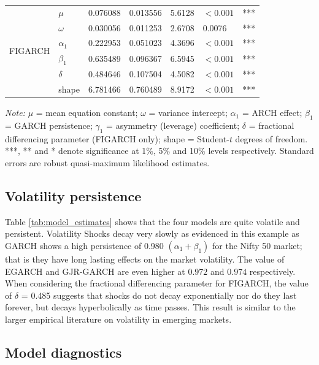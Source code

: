\begin{table}[H]
\begin{tabular}{|l|l|l|l|l|l|l|}
\hline
\multirow{6}{*}{FIGARCH}
 & $\mu$      & 0.076088 & 0.013556 & 5.6128  & $<0.001$ & *** \\
 & $\omega$   & 0.030056 & 0.011253 & 2.6708  & 0.0076   & *** \\
 & $\alpha_1$ & 0.222953 & 0.051023 & 4.3696  & $<0.001$ & *** \\
 & $\beta_1$  & 0.635489 & 0.096367 & 6.5945  & $<0.001$ & *** \\
 & $\delta$   & 0.484646 & 0.107504 & 4.5082  & $<0.001$ & *** \\
 & shape      & 6.781466 & 0.760489 & 8.9172  & $<0.001$ & *** \\
\hline
\end{tabular}
\end{table}


\vspace{-1em}
\noindent\footnotesize\textit{Note:} $\mu$ = mean equation 
constant; $\omega$ = variance intercept; $\alpha_1$ = ARCH 
effect; $\beta_1$ = GARCH persistence; $\gamma_1$ = 
asymmetry (leverage) coefficient; $\delta$ = fractional 
differencing parameter (FIGARCH only); shape = Student-$t$ 
degrees of freedom. ***, ** and * denote significance at 
1\%, 5\% and 10\% levels respectively. Standard errors 
are robust quasi-maximum likelihood estimates.




\subsection{Volatility persistence}

Table \ref{tab:model_estimates}  shows that the four models are quite volatile and persistent. Volatility Shocks decay very slowly as evidenced in this example as GARCH shows a high persistence of 0.980
$(\alpha_1 + \beta_1)$ for the Nifty 50 market; that is they have long lasting effects on the market volatility. The value of EGARCH and GJR-GARCH are even higher at $0.972$ and $0.974$ respectively. When considering the fractional differencing parameter for FIGARCH, the value of $\delta$ = 0.485 suggests that shocks do not decay exponentially nor do they last forever, but decays hyperbolically as time passes. This result is similar to the larger empirical literature on volatility in emerging markets.



\subsection{Model diagnostics}


